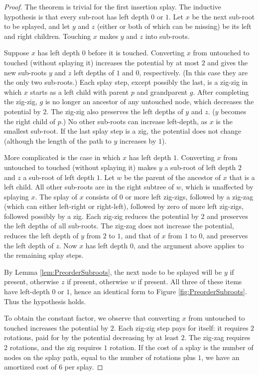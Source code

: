 \documentclass{article}
\theoremstyle{plain}
\theoremstyle{definition}
\begin{document}
\begin{proof}
%
The theorem is trivial for the first insertion splay. The inductive hypothesis
is that every sub-root has left depth $0$ or $1$. Let $x$ be the next sub-root
to be splayed, and let $y$ and $z$ (either or both of which can be missing) be
its left and right children. Touching $x$ makes $y$ and $z$ into sub-roots.

%
Suppose $x$ has left depth $0$ before it is touched. Converting $x$ from
untouched to touched (without splaying it) increases the potential by at most
$2$ and gives the new sub-roots $y$ and $z$ left depths of $1$ and $0$,
respectively. (In this case they are the only two sub-roots.) Each splay step,
except possibly the last, is a zig-zig in which $x$ starts as a left child with
parent $p$ and grandparent $g$. After completing the zig-zig, $g$ is no longer
an ancestor of any untouched node, which decreases the potential by $2$. The
zig-zig also preserves the left depths of $y$ and $z$. ($y$ becomes the right
child of $p$.) No other sub-roots can increase left-depth, as $x$ is the
smallest sub-root. If the last splay step is a zig, the potential does not
change (although the length of the path to $y$ increases by $1$).

%
More complicated is the case in which $x$ has left depth $1$. Converting $x$
from untouched to touched (without splaying it) makes $y$ a sub-root of left
depth $2$ and $z$ a sub-root of left depth $1$. Let $w$ be the parent of the
ancestor of $x$ that is a left child. All other sub-roots are in the right
subtree of $w$, which is unaffected by splaying $x$. The splay of $x$ consists
of $0$ or more left zig-zigs, followed by a zig-zag (which can either
left-right or right-left), followed by zero of more left zig-zigs, followed
possibly by a zig. Each zig-zig reduces the potential by $2$ and preserves the
left depths of all sub-roots. The zig-zag does not increase the potential,
reduces the left depth of $y$ from $2$ to $1$, and that of $x$ from $1$ to $0$,
and preserves the left depth of $z$. Now $x$ has left depth $0$, and the
argument above applies to the remaining splay steps.

%
By Lemma \ref{lem:PreorderSubroots}, the next node to be splayed will be $y$
if present, otherwise $z$ if present, otherwise $w$ if present. All three of
these items have left-depth $0$ or $1$, hence an identical form to Figure
\ref{fig:PreorderSubroots}. Thus the hypothesis holds.

%
To obtain the constant factor, we observe that converting $x$ from untouched
to touched increases the potential by $2$. Each zig-zig step pays for itself:
it requires $2$ rotations, paid for by the potential decreasing by at least
$2$. The zig-zag requires $2$ rotations, and the zig requires $1$ rotation. If
the cost of a splay is the number of nodes on the splay path, equal to the
number of rotations plus $1$, we have an amortized cost of $6$ per splay.
\end{proof}
\end{document}
